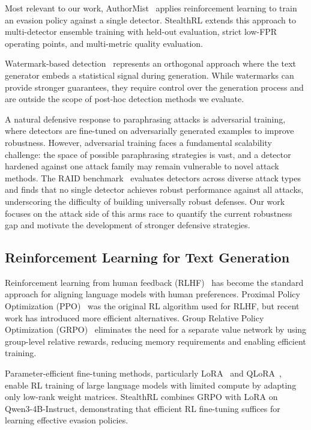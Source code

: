 \documentclass[11pt]{article}
\begin{document}
Most relevant to our work, AuthorMist~\cite{david2025authormistevadingaitext} applies reinforcement learning to train an evasion policy against a single detector. StealthRL extends this approach to multi-detector ensemble training with held-out evaluation, strict low-FPR operating points, and multi-metric quality evaluation.

Watermark-based detection~\cite{kirchenbauer2023watermark} represents an orthogonal approach where the text generator embeds a statistical signal during generation. While watermarks can provide stronger guarantees, they require control over the generation process and are outside the scope of post-hoc detection methods we evaluate.

A natural defensive response to paraphrasing attacks is adversarial training, where detectors are fine-tuned on adversarially generated examples to improve robustness. However, adversarial training faces a fundamental scalability challenge: the space of possible paraphrasing strategies is vast, and a detector hardened against one attack family may remain vulnerable to novel attack methods. The RAID benchmark~\cite{dugan2024raidsharedbenchmarkrobust} evaluates detectors across diverse attack types and finds that no single detector achieves robust performance against all attacks, underscoring the difficulty of building universally robust defenses. Our work focuses on the attack side of this arms race to quantify the current robustness gap and motivate the development of stronger defensive strategies.

\subsection{Reinforcement Learning for Text Generation}

Reinforcement learning from human feedback (RLHF)~\cite{ouyang2022training} has become the standard approach for aligning language models with human preferences. Proximal Policy Optimization (PPO)~\cite{schulman2017ppo} was the original RL algorithm used for RLHF, but recent work has introduced more efficient alternatives. Group Relative Policy Optimization (GRPO)~\cite{pang2025grpo,shao2024deepseekmath} eliminates the need for a separate value network by using group-level relative rewards, reducing memory requirements and enabling efficient training.

Parameter-efficient fine-tuning methods, particularly LoRA~\cite{hu2021loralowrankadaptationlarge} and QLoRA~\cite{dettmers2023qlora}, enable RL training of large language models with limited compute by adapting only low-rank weight matrices. StealthRL combines GRPO with LoRA on Qwen3-4B-Instruct, demonstrating that efficient RL fine-tuning suffices for learning effective evasion policies.
\end{document}
